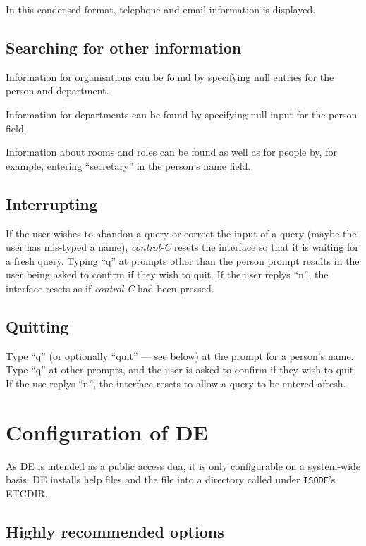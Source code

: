 In this condensed format, telephone and email information is displayed.

\subsection {Searching for other information}

Information for organisations can be found by specifying null entries for 
the person and department.

Information for departments can be found by specifying null input for
the person field.

Information about rooms and roles can be found as well as for people by, for
example, entering ``secretary'' in the person's name field.

\subsection{Interrupting}

If the user wishes to abandon a query or correct the input of a query (maybe
the user has mis-typed a name), {\em control-C} resets the interface 
so that it is
waiting for a fresh query.  Typing ``q'' at prompts other than the person
prompt results in the user being asked to confirm if they wish to quit.
If the user replys ``n'', the interface resets as if {\em control-C} had been
pressed.

\subsection{Quitting}

Type ``q'' (or optionally ``quit'' --- see below) at the prompt for a person's 
name.  Type ``q'' at other prompts, and the user is asked to confirm if they 
wish to quit.  If the use replys ``n'', the interface resets to allow a
query to be entered afresh.

\section {Configuration of DE}

As DE is intended as a public access dua, it is only configurable on a
system-wide basis.
DE installs help files and the  file into a directory 
called  under \verb+ISODE+'s ETCDIR.

\subsection{Highly recommended options}

